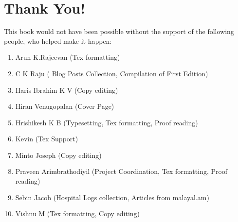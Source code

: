 \section*{Thank You!}

This book would not have been possible without the support of the following 
people, who helped make it happen:
\begin{enumerate}
 \item Arun K.Rajeevan (Tex formatting)
 \item C K Raju ( Blog Posts Collection, Compilation of First Edition)
 \item Haris Ibrahim K V (Copy editing)
 \item Hiran Venugopalan (Cover Page)
 \item Hrishikesh K B (Typesetting, Tex formatting, Proof reading)
 \item Kevin (Tex Support)
 \item Minto Joseph (Copy editing)
 \item Praveen Arimbrathodiyil (Project Coordination, Tex formatting, Proof reading)
 \item Sebin Jacob (Hospital Logs collection, Articles from malayal.am)
 \item Vishnu M (Tex formatting, Copy editing)
\end{enumerate}

\newpage
